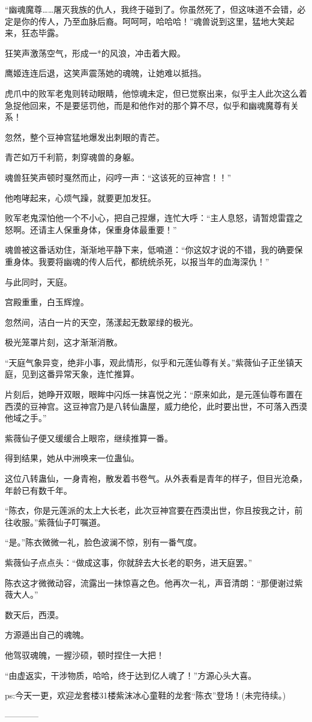 \begin{this_body}
“幽魂魔尊……屠灭我族的仇人，我终于碰到了。你虽然死了，但这味道不会错，必定是你的传人，乃至血脉后裔。呵呵呵，哈哈哈！”魂兽说到这里，猛地大笑起来，狂态毕露。

狂笑声激荡空气，形成一*的风浪，冲击着大殿。

鹰姬连连后退，这笑声震荡她的魂魄，让她难以抵挡。

虎爪中的败军老鬼则转动眼睛，他惊魂未定，但已觉察出来，似乎主人此次这么着急捉他回来，不是要惩罚他，而是和他作对的那个算不尽，似乎和幽魂魔尊有关系！

忽然，整个豆神宫猛地爆发出刺眼的青芒。

青芒如万千利箭，刺穿魂兽的身躯。

魂兽狂笑声顿时戛然而止，闷哼一声：“这该死的豆神宫！！”

他咆哮起来，心烦气躁，就要更加发狂。

败军老鬼深怕他一个不小心，把自己捏爆，连忙大呼：“主人息怒，请暂熄雷霆之怒啊。还请主人保重身体，保重身体最重要！”

魂兽被这番话劝住，渐渐地平静下来，低喃道：“你这奴才说的不错，我的确要保重身体。我要将幽魂的传人后代，都统统杀死，以报当年的血海深仇！”

与此同时，天庭。

宫殿重重，白玉辉煌。

忽然间，洁白一片的天空，荡漾起无数翠绿的极光。

极光笼罩片刻，这才渐渐消散。

“天庭气象异变，绝非小事，观此情形，似乎和元莲仙尊有关。”紫薇仙子正坐镇天庭，见到这番异常天象，连忙推算。

片刻后，她睁开双眼，眼眸中闪烁一抹喜悦之光：“原来如此，是元莲仙尊布置在西漠的豆神宫。这豆神宫乃是八转仙蛊屋，威力绝伦，此时要出世，不可落入西漠他域之手。”

紫薇仙子便又缓缓合上眼帘，继续推算一番。

得到结果，她从中洲唤来一位蛊仙。

这位八转蛊仙，一身青袍，散发着书卷气。从外表看是青年的样子，但目光沧桑，年龄已有数千年。

“陈衣，你是元莲派的太上大长老，此次豆神宫要在西漠出世，你且按我之计，前往收服。”紫薇仙子叮嘱道。

“是。”陈衣微微一礼，脸色波澜不惊，别有一番气度。

紫薇仙子点点头：“做成这事，你就辞去大长老的职务，进天庭罢。”

陈衣这才微微动容，流露出一抹惊喜之色。他再次一礼，声音清朗：“那便谢过紫薇大人。”

数天后，西漠。

方源遁出自己的魂魄。

他驾驭魂魄，一握沙硕，顿时捏住一大把！

“由虚返实，干涉物质，哈哈，终于达到亿人魂了！”方源心头大喜。

ps:今天一更，欢迎龙套楼31楼紫沫冰心童鞋的龙套“陈衣”登场！(未完待续。)

------------

\end{this_body}


